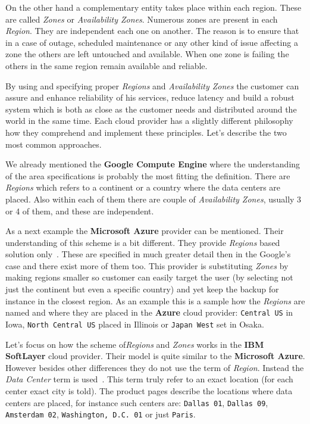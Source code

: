 On the other hand a complementary entity takes place within each region. These are called \emph{Zones} or \emph{Availability Zones}. Numerous zones are present in each \emph{Region}. They are independent each one on another. The reason is to ensure that in a case of outage, scheduled maintenance or any other kind of issue affecting a zone the others are left untouched and available. When one zone is failing the others in the same region remain available and reliable.

By using and specifying proper \emph{Regions} and \emph{Availability Zones} the customer can assure and enhance reliability of his services, reduce latency and build a robust system which is both as close as the customer needs and distributed around the world in the same time. Each cloud provider has a slightly different philosophy how they comprehend and implement these principles. Let's describe the two most common approaches.

We already mentioned the \textbf{Google Compute Engine} where the understanding of the area specifications is probably the most fitting the definition. There are \emph{Regions} which refers to a continent or a country where the data centers are placed. Also within each of them there are couple of \emph{Availability Zones}, usually 3 or 4 of them, and these are independent.

As a next example the \textbf{Microsoft Azure} provider can be mentioned. Their understanding of this scheme is a bit different. They provide \emph{Regions} based solution only~\cite{azure}. These are specified in much greater detail then in the Google's case and there exist more of them too. This provider is substituting \emph{Zones} by making regions smaller so customer can easily target the user (by selecting not just the continent but even a specific country) and yet keep the backup for instance in the closest region. As an example this is a sample how the \emph{Regions} are named and where they are placed in the \textbf{Azure} cloud provider: \texttt{Central US} in Iowa, \texttt{North Central US} placed in Illinois or \texttt{Japan West} set in Osaka.

Let's focus on how the scheme of\emph{Regions} and \emph{Zones} works in the \textbf{IBM SoftLayer} cloud provider. Their model is quite similar to the \textbf{Microsoft Azure}. However besides other differences they do not use the term of \emph{Region}. Instead the \emph{Data Center} term is used~\cite{softlayer_datacenters}. This term truly refer to an exact location (for each center exact city is told). The product pages describe the locations where data centers are placed, for instance such centers are: \texttt{Dallas 01}, \texttt{Dallas 09}, \texttt{Amsterdam 02}, \texttt{Washington, D.C. 01} or just \texttt{Paris}.

